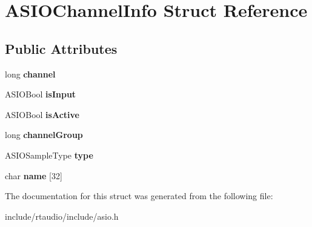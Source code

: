 \hypertarget{struct_a_s_i_o_channel_info}{}\section{A\+S\+I\+O\+Channel\+Info Struct Reference}
\label{struct_a_s_i_o_channel_info}
\subsection*{Public Attributes}
\begin{DoxyCompactItemize}
\item 
long {\bfseries channel}\hypertarget{struct_a_s_i_o_channel_info_a8194732455e0dc35d40afce4bd517102}{}\label{struct_a_s_i_o_channel_info_a8194732455e0dc35d40afce4bd517102}

\item 
A\+S\+I\+O\+Bool {\bfseries is\+Input}\hypertarget{struct_a_s_i_o_channel_info_a2af889711597c69d23012f93d29330a6}{}\label{struct_a_s_i_o_channel_info_a2af889711597c69d23012f93d29330a6}

\item 
A\+S\+I\+O\+Bool {\bfseries is\+Active}\hypertarget{struct_a_s_i_o_channel_info_a28bfa2a7fd9852e4fc485e717dc4b263}{}\label{struct_a_s_i_o_channel_info_a28bfa2a7fd9852e4fc485e717dc4b263}

\item 
long {\bfseries channel\+Group}\hypertarget{struct_a_s_i_o_channel_info_a227610e42488719ece8042b718d52d0e}{}\label{struct_a_s_i_o_channel_info_a227610e42488719ece8042b718d52d0e}

\item 
A\+S\+I\+O\+Sample\+Type {\bfseries type}\hypertarget{struct_a_s_i_o_channel_info_a5f1810794e4ed2650a467f73cecc4768}{}\label{struct_a_s_i_o_channel_info_a5f1810794e4ed2650a467f73cecc4768}

\item 
char {\bfseries name} \mbox{[}32\mbox{]}\hypertarget{struct_a_s_i_o_channel_info_a82ab76288122b40724f6e45fc63be7fa}{}\label{struct_a_s_i_o_channel_info_a82ab76288122b40724f6e45fc63be7fa}

\end{DoxyCompactItemize}


The documentation for this struct was generated from the following file\+:\begin{DoxyCompactItemize}
\item 
include/rtaudio/include/asio.\+h\end{DoxyCompactItemize}

